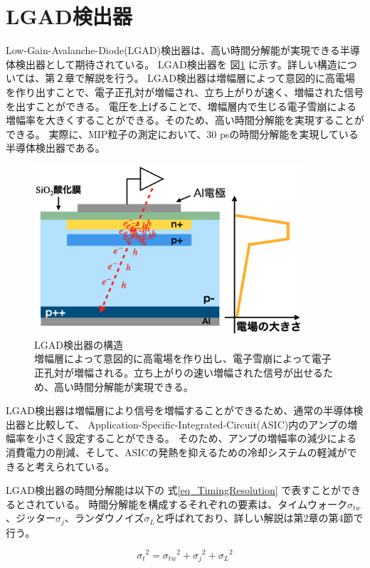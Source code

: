 \section{LGAD検出器}
Low-Gain-Avalanche-Diode(LGAD)検出器は、高い時間分解能が実現できる半導体検出器として期待されている。
LGAD検出器を 図\ref{fg:LGAD} に示す。詳しい構造については、第２章で解説を行う。
LGAD検出器は増幅層によって意図的に高電場を作り出すことで、電子正孔対が増幅され、立ち上がりが速く、増幅された信号を出すことができる。
電圧を上げることで、増幅層内で生じる電子雪崩による増幅率を大きくすることができる。そのため、高い時間分解能を実現することができる。
実際に、MIP粒子の測定において、30 psの時間分解能\cite{Yang_2020}を実現している半導体検出器である。

\begin{figure}[h]
    \centering
    \includegraphics[width=10cm]{fig/ch1/LGAD.png}
    \caption[LGAD検出器の構造]{LGAD検出器の構造\\増幅層によって意図的に高電場を作り出し、電子雪崩によって電子正孔対が増幅される。立ち上がりの速い増幅された信号が出せるため、高い時間分解能が実現できる。}
    \label{fg:LGAD}
\end{figure}

LGAD検出器は増幅層により信号を増幅することができるため、通常の半導体検出器と比較して、
Application-Specific-Integrated-Circuit(ASIC)内のアンプの増幅率を小さく設定することができる。
そのため、アンプの増幅率の減少による消費電力の削減、そして、ASICの発熱を抑えるための冷却システムの軽減ができると考えられている。

LGAD検出器の時間分解能は以下の 式\ref{eq_TimingResolution} で表すことができるとされている。
時間分解能を構成するそれぞれの要素は、タイムウォーク$\sigma_{tw}$、ジッター$\sigma_{j}$、ランダウノイズ$\sigma_{L}$と呼ばれており、詳しい解説は第2章の第4節で行う。

\begin{equation}
    {\sigma_t}^2 = {\sigma_{tw}}^2 + {\sigma_j}^2 + {\sigma_L}^2
    \label{eq_TimingResolution}
\end{equation}

